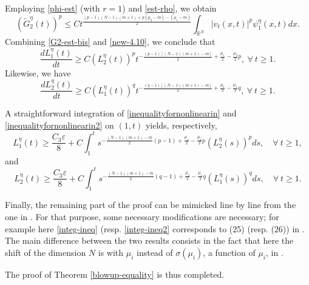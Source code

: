 \documentclass[12pt,leqno]{amsart}
\numberwithin{equation}{section}
\theoremstyle{remark}
\def\R{{\mathbb{R}}}
\def\d{\displaystyle}
\def\e{{\varepsilon}}
\begin{document}
Employing \eqref{phi-est}  (with $r=1$) and \eqref{est-rho}, we obtain
\begin{equation}\label{new-4.10}
\d (\tilde{G}^{\eta}_2(t))^p \le \d C t^{\frac{(p-1)(N-1)(m+1)+p(\mu_2-m)-(\mu_1-m)}{2}}\int_{\R^N}|v_t(x,t)|^p\psi^{\eta}_1(x,t) dx.
\end{equation}
Combining  \eqref{G2-est-bis} and \eqref{new-4.10}, we conclude that
\begin{equation}
\label{inequalityfornonlinearin}
\d \frac{d L^{\eta}_1(t)}{dt}\geq C (L^{\eta}_2(t))^p  t^{-\frac{(p-1)[(N-1)(m+1)-m]}{2}+ \frac{\mu_1}{2}-\frac{\mu_2}{2}p}, \ \forall \ t \ge 1.
\end{equation}
 Likewise, we have
\begin{equation}
\label{inequalityfornonlinearin2}
\frac{d L^{\eta}_2(t)}{dt}\geq C (L^{\eta}_1(t))^q  t^{-\frac{(q-1)[(N-1)(m+1)-m]}{2}+ \frac{\mu_2}{2}-\frac{\mu_1}{2}q}, \ \forall \ t \ge 1.
\end{equation}





A straightforward integration of \eqref{inequalityfornonlinearin} and \eqref{inequalityfornonlinearin2} on $(1, t)$ yields, respectively,
\begin{equation}\label{integ-ineq}
L^{\eta}_1(t)\geq \frac{C_3 \e}{8}+C \int_{1}^t  s^{-\frac{(N-1)(m+1)-m}{2}(p-1)+ \frac{\mu_1}{2}-\frac{\mu_2}{2}p}(L^{\eta}_2(s))^p ds, \quad \forall \ t \ge 1,
\end{equation}
and
\begin{equation}\label{integ-ineq2}
L^{\eta}_2(t)\geq \frac{C_3 \e}{8}+C \int_{1}^t  s^{-\frac{(N-1)(m+1)-m}{2}(q-1)+ \frac{\mu_2}{2}-\frac{\mu_1}{2}q}(L^{\eta}_1(s))^q ds, \quad \forall \ t \ge 1.
\end{equation}



Finally, the remaining part of the proof can be mimicked line by line from the one in \cite[Sections 4.2 and 4.3]{Palmieri}. For that purpose, some necessary modifications are necessary; for example here \eqref{integ-ineq} (resp. \eqref{integ-ineq2} corresponds to (25) (resp. (26)) in \cite{Palmieri}. The main difference between the two results consists in the fact that here the shift of the dimension $N$ is with  $\mu_i$ instead of $\sigma(\mu_i)$, a function of $\mu_i$, in \cite{Palmieri}.

 The proof of Theorem \ref{blowup-equality} is thus completed.
\end{document}
